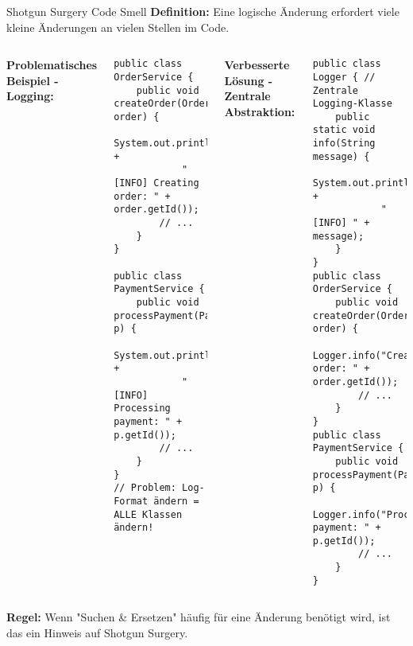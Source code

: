 \begin{frame}[fragile]{Shotgun Surgery Code Smell}
  \textbf{Definition:} Eine logische Änderung erfordert viele kleine Änderungen an vielen Stellen im Code.
  \begin{columns}[T]
    \textbf{Problematisches Beispiel - Logging:}
    \begin{lstlisting}[style=java, basicstyle=\tiny\ttfamily]
public class OrderService {
    public void createOrder(Order order) {
        System.out.println(LocalDateTime.now() +
            " [INFO] Creating order: " + order.getId());
        // ...
    }
}

public class PaymentService {
    public void processPayment(Payment p) {
        System.out.println(LocalDateTime.now() +
            " [INFO] Processing payment: " + p.getId());
        // ...
    }
}
// Problem: Log-Format ändern = ALLE Klassen ändern!
    \end{lstlisting}
    \textbf{Verbesserte Lösung - Zentrale Abstraktion:}
    \begin{lstlisting}[style=java, basicstyle=\tiny\ttfamily]
public class Logger { // Zentrale Logging-Klasse
    public static void info(String message) {
        System.out.println(LocalDateTime.now() +
            " [INFO] " + message);
    }
}
public class OrderService {
    public void createOrder(Order order) {
        Logger.info("Creating order: " + order.getId());
        // ...
    }
}
public class PaymentService {
    public void processPayment(Payment p) {
        Logger.info("Processing payment: " + p.getId());
        // ...
    }
}
    \end{lstlisting}
  \end{columns}
  \textbf{Regel:} Wenn "Suchen \& Ersetzen" häufig für eine Änderung benötigt wird, ist das ein Hinweis auf Shotgun Surgery.
\end{frame}

